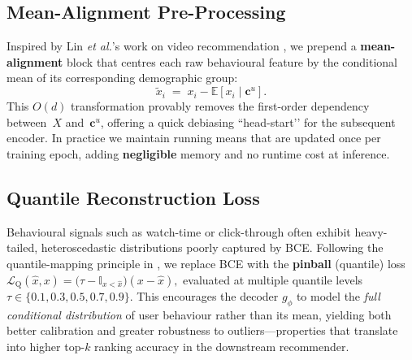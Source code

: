 \documentclass{article}
\begin{document}
\subsection{Mean-Alignment Pre-Processing}
\label{ssec:meanalign}
Inspired by Lin \textit{et al.}’s  work on video
recommendation \cite{Lin2025AlignPxtr} , we prepend a
\textbf{mean-alignment} block that centres each raw behavioural feature by the
conditional mean of its corresponding demographic group:
\[
    \tilde{x}_{i} \;=\;
      x_{i} - \mathbb E\!\left[x_{i}\mid \mathbf c^{u}\right].
\]
This $O(d)$ transformation provably removes the first-order dependency
between~$X$ and~$\mathbf c^{u}$, offering a quick debiasing “head-start’’ for
the subsequent encoder.  In practice we maintain running means that are
updated once per training epoch, adding \textbf{negligible} memory and no
runtime cost at inference.

\subsection{Quantile Reconstruction Loss}
\label{ssec:quantile}
Behavioural signals such as watch-time or click-through often exhibit
heavy-tailed, heteroscedastic distributions poorly captured by BCE.
Following the quantile-mapping principle in \cite{Lin2025AlignPxtr},
we replace BCE with the \textbf{pinball} (quantile) loss
\(
    \mathcal L_{\text{Q}}(\hat{x},x)
    = \bigl(\tau - \mathbb I_{x<\hat{x}}\bigr)(x-\hat{x}),
\)
evaluated at multiple quantile levels
$\tau\!\in\!\{0.1,0.3,0.5,0.7,0.9\}$.  This encourages the decoder
$g_\phi$ to model the \emph{full conditional distribution} of user
behaviour rather than its mean, yielding both better calibration and
greater robustness to outliers—properties that translate into higher top-$k$
ranking accuracy in the downstream recommender.

\end{document}
